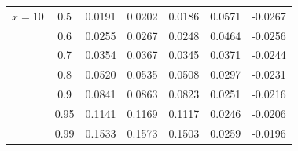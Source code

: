 \documentclass[12pt]{article}
\begin{document}
\begin{table}[p]
\begin{tabular}{||c|c||c|c|c||c|c||}
$x=10$ & 0.5 & 0.0191 & 0.0202 & 0.0186 & 0.0571 & -0.0267 \\
\cline{2-7}
& 0.6 & 0.0255 & 0.0267 & 0.0248 & 0.0464 & -0.0256 \\
\cline{2-7}
& 0.7 & 0.0354 & 0.0367 & 0.0345 & 0.0371 & -0.0244 \\
\cline{2-7}
& 0.8 & 0.0520 & 0.0535 & 0.0508 & 0.0297 & -0.0231 \\
\cline{2-7}
& 0.9 & 0.0841 & 0.0863 & 0.0823 & 0.0251 & -0.0216 \\
\cline{2-7}
& 0.95 & 0.1141 & 0.1169 & 0.1117 & 0.0246 & -0.0206 \\
\cline{2-7}
& 0.99 & 0.1533 & 0.1573 & 0.1503 & 0.0259 & -0.0196 \\
\hline\hline
  \end{tabular}
\end{table}
\end{document}
